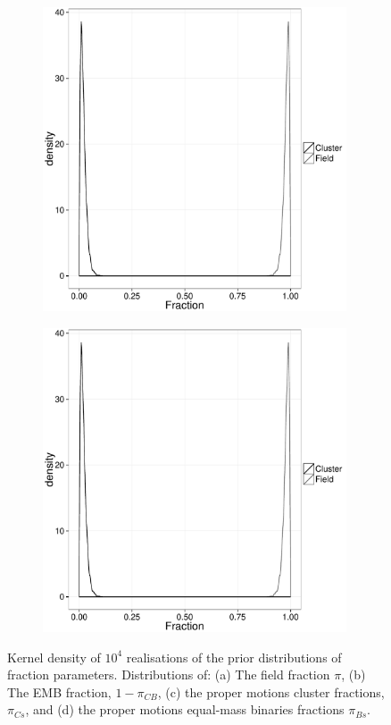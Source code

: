 \begin{figure}[ht!]
\begin{subfigure}[t]{0.48\textwidth}
        \caption{}
        \label{} 
    \end{subfigure}
     \begin{subfigure}[t]{0.48\textwidth}
      \includegraphics[page=3,height=9cm,width=\textwidth]{background/Figures/Priors.pdf}
        \caption{}
        \label{} 
    \end{subfigure}
     \begin{subfigure}[t]{0.48\textwidth}
      \includegraphics[page=4,height=9cm,width=\textwidth]{background/Figures/Priors.pdf}
        \caption{}
        \label{} 
    \end{subfigure}
\caption{Kernel density of $10^4$ realisations of the prior distributions of fraction parameters. Distributions of: (a) The field fraction $\pi$, (b) The EMB fraction, $1-\pi_{CB}$, (c) the proper motions cluster fractions, $\pi_{Cs}$, and (d) the proper motions equal-mass binaries fractions $\pi_{Bs}$.}
\label{figure:priors}
\end{figure}

